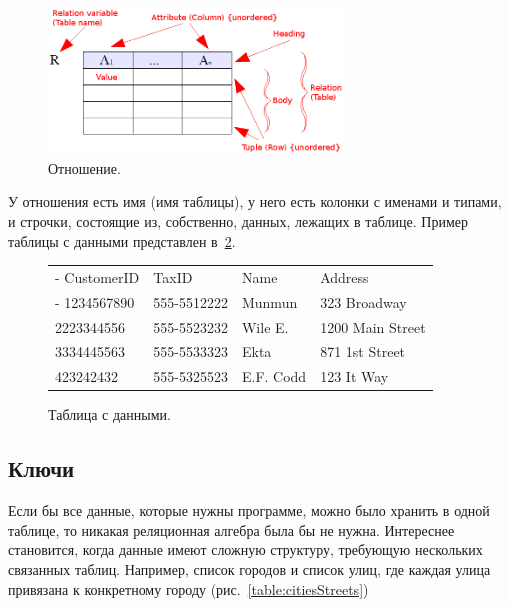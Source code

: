 \documentclass[a5paper]{article}
\begin{document}
\begin{figure}
	\begin{center}
		\includegraphics[width=0.7\textwidth]{relationalModel.png}
	\end{center}
	\caption{Отношение.}
	\label{image:table}
\end{figure}

У отношения есть имя (имя таблицы), у него есть колонки с именами и типами, и строчки, состоящие из, собственно, данных, лежащих в таблице. Пример таблицы с данными представлен в~\ref{table:tableWithData}.

\begin{figure}
	\begin{center}
		\begin{tabu} {| X[0.9 l p] | X[1 l p] | X[1 l p] | X[1 l p] |}
			\tabucline-
			CustomerID       & TaxID        & Name       & Address           \\
			\tabucline-
			\everyrow{\tabucline-}
			1234567890       & 555-5512222  & Munmun     & 323 Broadway      \\
			2223344556       & 555-5523232  & Wile E.    & 1200 Main Street  \\
			3334445563       & 555-5533323  & Ekta       & 871 1st Street    \\
			423242432        & 555-5325523  & E.F. Codd  & 123 It Way        \\
		\end{tabu}
	\end{center}
	\caption{Таблица с данными.}
	\label{table:tableWithData}
\end{figure}

\subsection{Ключи}

Если бы все данные, которые нужны программе, можно было хранить в одной таблице, то никакая реляционная алгебра была бы не нужна. Интереснее становится, когда данные имеют сложную структуру, требующую нескольких связанных таблиц. Например, список городов и список улиц, где каждая улица привязана к конкретному городу (рис.~\ref{table:citiesStreets})
\end{document}
